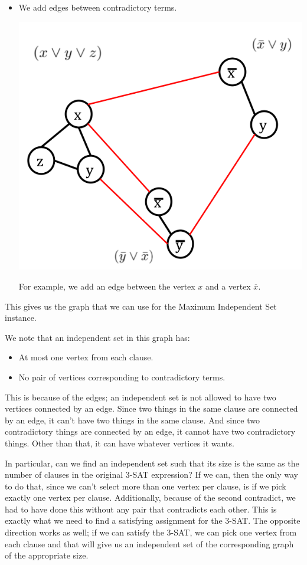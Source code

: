 \documentclass[letterpaper]{article}
\begin{document}
\begin{itemize}
\begin{itemize}
        \item We add edges between contradictory terms.
        \begin{center}
            \includegraphics[scale=0.4]{assets/3sat_mis_3.png}
        \end{center}
        For example, we add an edge between the vertex $x$ and a vertex $\overline{x}$. 
    \end{itemize}
    This gives us the graph that we can use for the Maximum Independent Set instance. 
\end{itemize}

We note that an independent set in this graph has: 
\begin{itemize}
    \item At most one vertex from each clause. 
    \item No pair of vertices corresponding to contradictory terms. 
\end{itemize}
This is because of the edges; an independent set is not allowed to have two vertices connected by an edge. Since two things in the same clause are connected by an edge, it can't have two things in the same clause. And since two contradictory things are connected by an edge, it cannot have two contradictory things. Other than that, it can have whatever vertices it wants. 

\bigskip 

In particular, can we find an independent set such that its size is the same as the number of clauses in the original 3-SAT expression? If we can, then the only way to do that, since we can't select more than one vertex per clause, is if we pick exactly one vertex per clause. Additionally, because of the second contradict, we had to have done this without any pair that contradicts each other. This is exactly what we need to find a satisfying assignment for the 3-SAT. The opposite direction works as well; if we can satisfy the 3-SAT, we can pick one vertex from each clause and that will give us an independent set of the corresponding graph of the appropriate size. 
\end{document}
